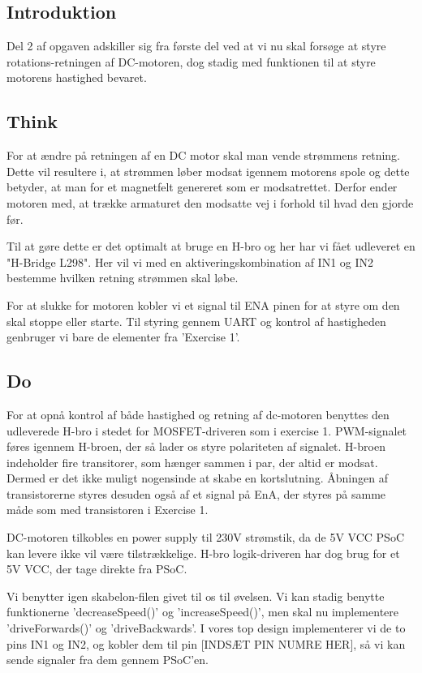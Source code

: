 \documentclass[../main.tex]{subfiles}
\begin{document}
\subsection{Introduktion}
Del 2 af opgaven adskiller sig fra første del ved at vi nu skal forsøge at styre rotations-retningen af DC-motoren, dog stadig med funktionen til at styre motorens hastighed bevaret.

\subsection{Think}
For at ændre på retningen af en DC motor skal man vende strømmens retning. 
Dette vil resultere i, at strømmen løber modsat igennem motorens spole og dette betyder, at man for et magnetfelt genereret som er modsatrettet.
Derfor ender motoren med, at trække armaturet den modsatte vej i forhold til hvad den gjorde før.

Til at gøre dette er det optimalt at bruge en H-bro og her har vi fået udleveret en "H-Bridge L298".
Her vil vi med en aktiveringskombination af IN1 og IN2 bestemme hvilken retning strømmen skal løbe.

For at slukke for motoren kobler vi et signal til ENA pinen for at styre om den skal stoppe eller starte. Til styring gennem UART og kontrol af hastigheden genbruger vi bare de elementer fra 'Exercise 1'.

\subsection{Do}

For at opnå kontrol af både hastighed og retning af dc-motoren benyttes den udleverede H-bro i stedet for MOSFET-driveren som i exercise 1. PWM-signalet føres igennem H-broen, der så lader os styre polariteten af signalet. H-broen indeholder fire transitorer, som hænger sammen i par, der altid er modsat. Dermed er det ikke muligt nogensinde at skabe en kortslutning. Åbningen af transistorerne styres desuden også af et signal på EnA, der styres på samme måde som med transistoren i Exercise 1.

DC-motoren tilkobles en power supply til 230V strømstik, da de 5V VCC PSoC kan levere ikke vil være tilstrækkelige. H-bro logik-driveren har dog brug for et 5V VCC, der tage direkte fra PSoC.


Vi benytter igen skabelon-filen givet til os til øvelsen. Vi kan stadig benytte funktionerne ’decreaseSpeed()’ og ’increaseSpeed()’, men skal nu implementere ’driveForwards()’ og ’driveBackwards’. I vores top design implementerer vi de to pins IN1 og IN2, og kobler dem til pin [INDSÆT PIN NUMRE HER], så vi kan sende signaler fra dem gennem PSoC’en.
\end{document}
